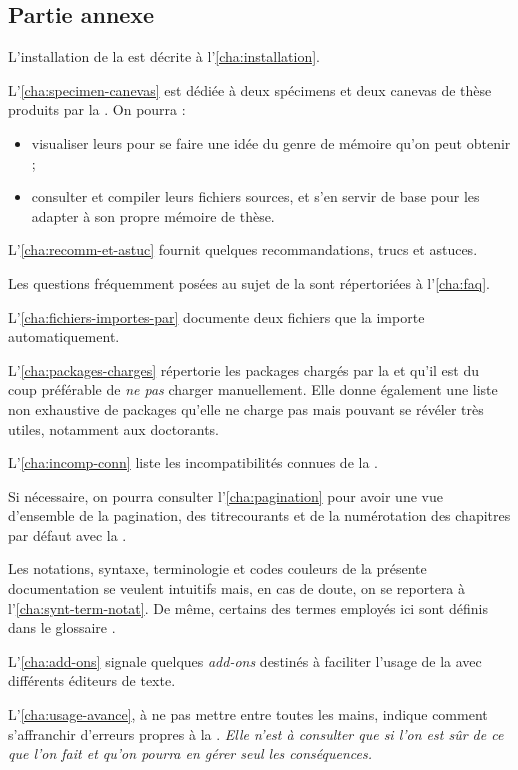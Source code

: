 \subsection{Partie annexe}
\label{sec:partie-annexe}

L'installation de la \yatcl{} est décrite à l'\vref{cha:installation}.

L'\vref{cha:specimen-canevas} est dédiée à deux spécimens et deux canevas de
thèse produits par la \yatcl{}. On pourra :
\begin{itemize}
\item visualiser leurs  pour se faire une idée du genre de
  mémoire qu'on peut obtenir ;
\item consulter et compiler leurs fichiers sources, et s'en servir de base pour
  les adapter à son propre mémoire de thèse.
\end{itemize}

L'\vref{cha:recomm-et-astuc} fournit quelques recommandations, trucs et astuces.

Les questions fréquemment posées au sujet de la \yatcl{} sont répertoriées
à l'\vref{cha:faq}.

L'\vref{cha:fichiers-importes-par} documente deux fichiers que la \yatcl{}
importe automatiquement.

L'\vref{cha:packages-charges} répertorie les packages chargés par la \yatcl{} et
qu'il est du coup préférable de \emph{ne pas} charger manuellement. Elle donne
également une liste non exhaustive de packages qu'elle ne charge pas mais
pouvant se révéler très utiles, notamment aux doctorants.

L'\vref{cha:incomp-conn} liste les incompatibilités connues de la \yatcl{}.

Si nécessaire, on pourra consulter l'\vref{cha:pagination} pour avoir une vue
d'ensemble de la \gls{pagination}, des \glspl{titrecourant} et de la
numérotation des chapitres par défaut avec la \yatcl{}.

Les notations, syntaxe, terminologie et codes couleurs de la présente
documentation se veulent intuitifs mais, en cas de doute, on se reportera
à l'\vref{cha:synt-term-notat}. De même, certains des termes employés ici sont
définis dans le glossaire .

L'\vref{cha:add-ons} signale quelques \emph{add-ons} destinés à faciliter
l'usage de la \yatcl{} avec différents éditeurs de texte.

L'\vref{cha:usage-avance}, à ne pas mettre entre toutes les mains, indique
comment s'affranchir d'erreurs propres à la \yatcl{}. \emph{Elle n'est
  à consulter que si l'on est sûr de ce que l'on fait et qu'on pourra en gérer
  \emph{seul} les conséquences.}

